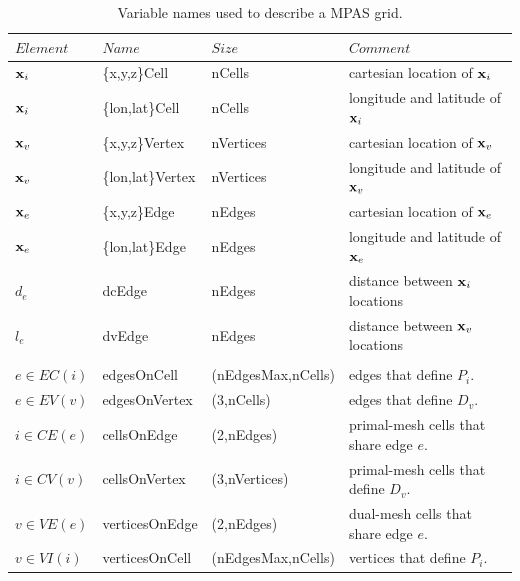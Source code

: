 \begin{table}[h]
\caption{Variable names used to describe a MPAS grid.}
\label{table:gridFileName}
\begin{center}
\begin{tabular}{llll}
\hline\hline
$Element$ & $Name$ & $Size$ & $Comment$\\
\hline
 ${\bf x}_i$   & \{x,y,z\}Cell          & nCells  & cartesian location of ${\bf x}_i$  \\
 ${\bf x}_i$   & \{lon,lat\}Cell        & nCells  & longitude and latitude of  ${\bf x}_i$  \\
 ${\bf x}_v$   & \{x,y,z\}Vertex      & nVertices  & cartesian location of ${\bf x}_v$  \\
 ${\bf x}_v$   & \{lon,lat\}Vertex    & nVertices  & longitude and latitude of  ${\bf x}_v$  \\
 ${\bf x}_e$   & \{x,y,z\}Edge          & nEdges  & cartesian location of ${\bf x}_e$  \\
 ${\bf x}_e$   & \{lon,lat\}Edge        & nEdges  & longitude and latitude of  ${\bf x}_e$  \\
 $d_{e}$       & dcEdge                   & nEdges  & distance between ${\bf x}_i$ locations\\
 $l_{e}$         & dvEdge             & nEdges &  distance between ${\bf x}_v$ locations \\
  &  & & \\
 $e \in EC(i) $   &  edgesOnCell  & (nEdgesMax,nCells) & edges that define $P_i$. \\
 $e \in EV(v) $     & edgesOnVertex &  (3,nCells) & edges that define $D_v$. \\
 $i \in CE(e) $      & cellsOnEdge &  (2,nEdges) &  primal-mesh cells that share edge $e$. \\
 $i \in CV(v) $  &   cellsOnVertex &  (3,nVertices) &  primal-mesh cells that define $D_v$. \\
 $v\in VE(e) $  & verticesOnEdge &  (2,nEdges) &    dual-mesh cells that share edge $e$. \\
 $v \in VI(i) $   & verticesOnCell &  (nEdgesMax,nCells) & vertices that define $P_i$. \\
\hline
\end{tabular}
\end{center}
\end{table}
%

